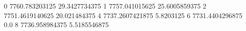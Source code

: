 0 7760.783203125 29.3427734375
1 7757.041015625 25.6005859375
2 7751.4619140625 20.021484375
4 7737.2607421875 5.8203125
6 7731.4404296875 0.0
8 7736.958984375 5.5185546875
